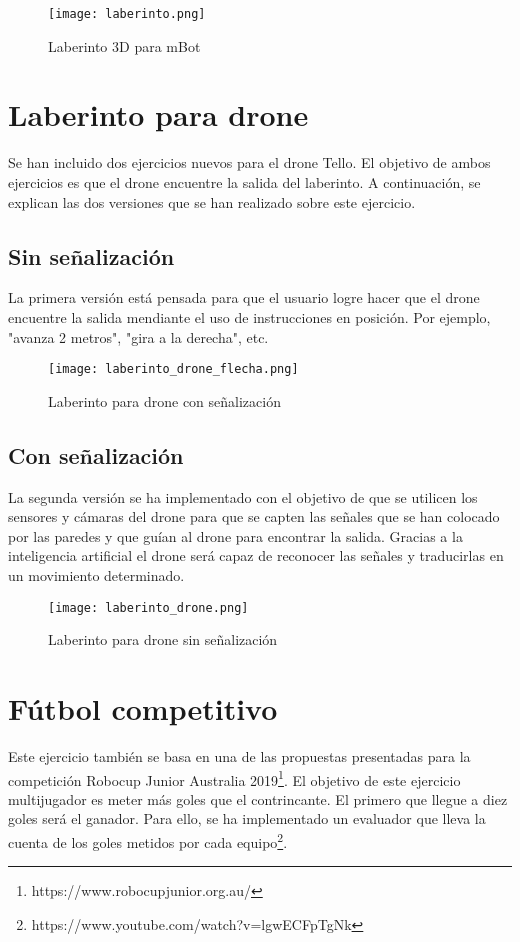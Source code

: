 \begin{figure}[h!]
    \centering
    \texttt{[image: laberinto.png]}
    \caption{Laberinto 3D para mBot}
    \label{fig:Laberinto 3D para mBot}
\end{figure}


\section{Laberinto para drone}
Se han incluido dos ejercicios nuevos para el drone Tello. El objetivo de ambos ejercicios es que el drone encuentre la salida del laberinto. A continuación, se explican las dos versiones que se han realizado sobre este ejercicio.

\subsection{Sin señalización}
La primera versión está pensada para que el usuario logre hacer que el drone encuentre la salida mendiante el uso de instrucciones en posición. Por ejemplo, "avanza 2 metros", "gira a la derecha", etc.

\begin{figure}[h!]
    \centering
    \texttt{[image: laberinto\_drone\_flecha.png]}
    \caption{Laberinto para drone con señalización}
    \label{fig:Laberinto_drone_señal}
\end{figure}

\subsection{Con señalización}
La segunda versión se ha implementado con el objetivo de que se utilicen los sensores y cámaras del drone para que se capten las señales que se han colocado por las paredes y que guían al drone para encontrar la salida. Gracias a la inteligencia artificial el drone será capaz de reconocer las señales y traducirlas en un movimiento determinado.

\begin{figure}[h!]
    \centering
    \texttt{[image: laberinto\_drone.png]}
    \caption{Laberinto para drone sin señalización}
    \label{fig:Laberinto_drone}
\end{figure}

\section{Fútbol competitivo}
Este ejercicio también se basa en una de las propuestas presentadas para la competición Robocup Junior Australia 2019\footnote{https://www.robocupjunior.org.au/}. El objetivo de este ejercicio multijugador es meter más goles que el contrincante. El primero que llegue a diez goles será el ganador. Para ello, se ha implementado un evaluador que lleva la cuenta de los goles metidos por cada equipo\footnote{https://www.youtube.com/watch?v=lgwECFpTgNk}. 

